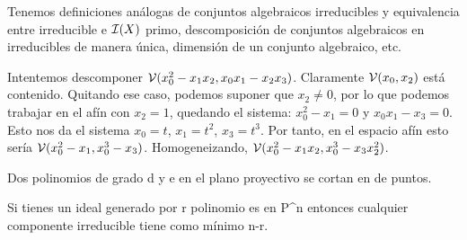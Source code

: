 \documentclass[ACGA.tex]{subfiles}
\begin{document}
Tenemos definiciones análogas de conjuntos algebraicos irreducibles y equivalencia entre irreducible e $\mathcal{I}(X)$ primo, descomposición de conjuntos algebraicos en irreducibles de manera única, dimensión de un conjunto algebraico, etc.

\begin{ejer}
Intentemos descomponer $\mathcal{V}(x_0^2-x_1x_2,x_0x_1-x_2x_3)$. Claramente $\mathcal{V}(x_0,x_2)$ está contenido. Quitando ese caso, podemos suponer que $x_2\neq 0$, por lo que podemos trabajar en el afín con $x_2=1$, quedando el sistema: $x_0^2-x_1=0$ y $x_0x_1-x_3=0$. Esto nos da el sistema $x_0 = t$, $x_1=t^2$, $x_3=t^3$. Por tanto, en el espacio afín esto sería $\mathcal{V}(x_0^2-x_1,x_0^3-x_3)$. Homogeneizando, $\mathcal{V}(x_0^2-x_1x_2,x_0^3-x_3x_2^2)$. 

Dos polinomios de grado d y e en el plano proyectivo se cortan en de puntos.

Si tienes un ideal generado por r polinomio es en P^n entonces cualquier componente irreducible tiene como mínimo n-r. 
\end{ejer}
\end{document}
